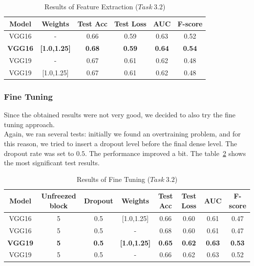 \documentclass[11pt,a4paper,oneside]{article}
\begin{document}
\begin{table}[h]
\centering
\begin{tabular}{|cc|cccc|}
\hline
Model & Weights & Test Acc & Test Loss & AUC & F-score \\
\hline
VGG16 & -		   & 0.66 & 0.59 & 0.63 & 0.52 \\
\textbf{VGG16} & \textbf{[1.0,1.25]} & \textbf{0.68} & \textbf{0.59} & \textbf{0.64} & \textbf{0.54} \\
VGG19 & - 		   & 0.67 & 0.61 & 0.62 & 0.48 \\
VGG19 & [1.0,1.25] & 0.67 & 0.61 & 0.62 & 0.48 \\
\hline
\end{tabular}
\caption{Results of Feature Extraction ($Task\ 3.2$)}
\label{tab:task3.2_fe}
\end{table}


\subsubsection{Fine Tuning}
Since the obtained results were not very good, we decided to also try the fine tuning approach. \\
Again, we ran several tests: initially we found an overtraining problem, and for this reason, we tried to insert a dropout level before the final dense level. The dropout rate was set to $0.5$. The performance improved a bit. The table~\ref{tab:task3.2_ft} shows the most significant test results. \\

\begin{table}[h]
\centering
\begin{tabular}{|cccc|cccc|}
\hline
Model & Unfreezed block & Dropout & Weights & Test Acc & Test Loss & AUC & F-score \\
\hline
VGG16 & 5 & 0.5 & [1.0,1.25] & 0.66 & 0.60 & 0.61 & 0.47 \\
VGG16 & 5 & 0.5 & - 	     & 0.68 & 0.60 & 0.61 & 0.47 \\
\textbf{VGG19} & \textbf{5} & \textbf{0.5} & \textbf{[1.0,1.25]} & \textbf{0.65} & \textbf{0.62} & \textbf{0.63} & \textbf{0.53} \\
VGG19 & 5 & 0.5 & -	   	     & 0.66 & 0.62 & 0.63 & 0.52 \\
\hline
\end{tabular}
\caption{Results of Fine Tuning ($Task\ 3.2$)}
\label{tab:task3.2_ft}
\end{table}

\clearpage
\end{document}
